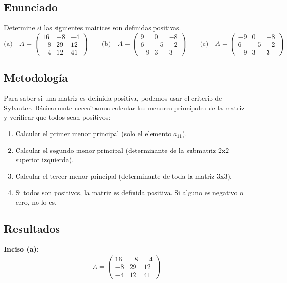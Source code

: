 \documentclass{article}
\begin{document}
\subsection{Enunciado}
Determine si las siguientes matrices son definidas positivas.
\[
\text{(a)}\quad
A=\begin{pmatrix}
16 & -8 & -4\\
-8 & 29 & 12\\
-4 & 12 & 41
\end{pmatrix}
\qquad
\text{(b)}\quad
A=\begin{pmatrix}
9 & 0 & -8\\
6 & -5 & -2\\
-9 & 3 & 3
\end{pmatrix}
\qquad
\text{(c)}\quad
A=\begin{pmatrix}
-9 & 0 & -8\\
6 & -5 & -2\\
-9 & 3 & 3
\end{pmatrix}
\]

\subsection{Metodología}

Para saber si una matriz es definida positiva, podemos usar el criterio de Sylvester. Básicamente necesitamos calcular los menores principales de la matriz y verificar que todos sean positivos:
\begin{enumerate}
    \item Calcular el primer menor principal (solo el elemento $a_{11}$).
    \item Calcular el segundo menor principal (determinante de la submatriz 2x2 superior izquierda).
    \item Calcular el tercer menor principal (determinante de toda la matriz 3x3).
    \item Si todos son positivos, la matriz es definida positiva. Si alguno es negativo o cero, no lo es.
\end{enumerate}

\subsection{Resultados}
\setcounter{equation}{0}

\textbf{Inciso (a):}
\begin{align}
    A=\begin{pmatrix} 16 & -8 & -4\\ -8 & 29 & 12\\ -4 & 12 & 41 \end{pmatrix}
\end{align}
\end{document}
